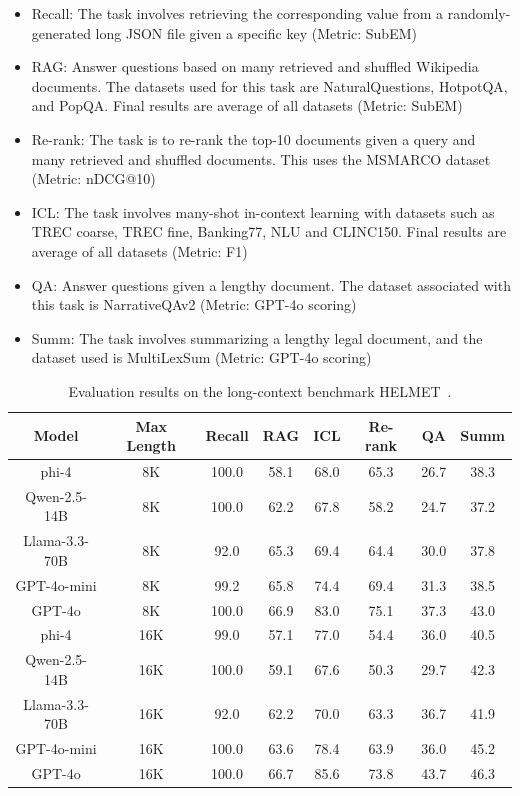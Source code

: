 \documentclass[11pt]{article}
\begin{document}
\begin{itemize}
    \item Recall: The task involves retrieving the corresponding value from a randomly-generated long JSON file given a specific key (Metric: SubEM)
    \item RAG: Answer questions based on many retrieved and shuffled Wikipedia documents. The datasets used for this task are NaturalQuestions, HotpotQA, and PopQA. Final results are average of all datasets (Metric: SubEM)
    \item Re-rank: The task is to re-rank the top-10 documents given a query and many retrieved and shuffled documents. This uses the MSMARCO dataset (Metric: nDCG@10)
    \item ICL: The task involves many-shot in-context learning with datasets such as TREC coarse, TREC fine, Banking77, NLU and CLINC150. Final results are average of all datasets (Metric: F1)
    \item QA: Answer questions given a lengthy document. The dataset associated with this task is NarrativeQAv2 (Metric: GPT-4o scoring)
    \item Summ: The task involves summarizing a lengthy legal document, and the dataset used is MultiLexSum (Metric: GPT-4o scoring)
\end{itemize}

\begin{table}[t!]
\centering
\small
\begin{tabular}{@{}cccccccc@{}}
\toprule
\textbf{Model} & \textbf{Max Length} & \textbf{Recall} & \textbf{RAG} & \textbf{ICL} & \textbf{Re-rank} & \textbf{QA} & \textbf{Summ} \\
\midrule
phi-4 & 8K & 100.0 & 58.1 & 68.0 & 65.3 & 26.7 & 38.3 \\
Qwen-2.5-14B & 8K & 100.0 & 62.2 & 67.8 & 58.2 & 24.7 & 37.2 \\
Llama-3.3-70B & 8K & 92.0 & 65.3 & 69.4 & 64.4 & 30.0 & 37.8 \\
GPT-4o-mini & 8K & 99.2 & 65.8 & 74.4 & 69.4 & 31.3 & 38.5 \\
GPT-4o & 8K & 100.0 & 66.9 & 83.0 & 75.1 & 37.3 & 43.0 \\
\midrule
phi-4 & 16K & 99.0 & 57.1 & 77.0 & 54.4 & 36.0 & 40.5 \\
Qwen-2.5-14B & 16K & 100.0 & 59.1 & 67.6 & 50.3 & 29.7 & 42.3 \\
Llama-3.3-70B & 16K & 92.0 & 62.2 & 70.0 & 63.3 & 36.7 & 41.9 \\
GPT-4o-mini & 16K & 100.0 & 63.6 & 78.4 & 63.9 & 36.0 & 45.2 \\
GPT-4o & 16K & 100.0 & 66.7 & 85.6 & 73.8 & 43.7 & 46.3 \\
\bottomrule
\end{tabular}
\caption{Evaluation results on the long-context benchmark HELMET~\cite{yen2024helmetevaluatelongcontextlanguage}.}
\label{tbl:helmet}
\end{table}
\end{document}
